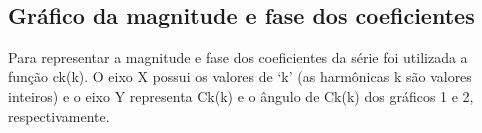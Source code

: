 \documentclass[11pt]{article}
\begin{document}
    \begin{center}
    \end{center}
    { \hspace*{\fill} \\}
    
    \hypertarget{gruxe1fico-da-magnitude-e-fase-dos-coeficientes}{%
\subsection{Gráfico da magnitude e fase dos
coeficientes}\label{gruxe1fico-da-magnitude-e-fase-dos-coeficientes}}

Para representar a magnitude e fase dos coeficientes da série foi
utilizada a função ck(k). O eixo X possui os valores de `k' (as
harmônicas k são valores inteiros) e o eixo Y representa
\textbar Ck(k)\textbar{} e o ângulo de Ck(k) dos gráficos 1 e 2,
respectivamente.
\end{document}
